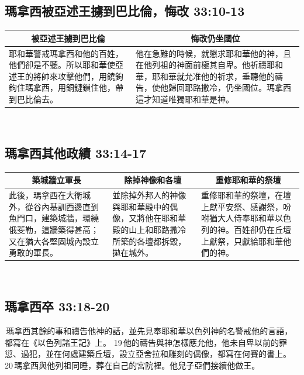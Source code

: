 \subsection{瑪拿西被亞述王擄到巴比倫，悔改 33:10-13}
\begin{table}[H]
\centering
\begin{tabular}{p{7.2cm}|p{}}\hline\hline
\multicolumn{1}{c|}{被亞述王擄到巴比倫}&\multicolumn{1}{c}{悔改仍坐國位}\\\hline
耶和華警戒瑪拿西和他的百姓，他們卻是不聽。所以耶和華使亞述王的將帥來攻擊他們，用鐃鉤鉤住瑪拿西，用銅鏈鎖住他，帶到巴比倫去。
&他在急難的時候，就懇求耶和華他的神，且在他列祖的神面前極其自卑。他祈禱耶和華，耶和華就允准他的祈求，垂聽他的禱告，使他歸回耶路撒冷，仍坐國位。瑪拿西這才知道唯獨耶和華是神。\\\hline 
\end{tabular}
\end{table} 



\subsection{瑪拿西其他政績 33:14-17}
\begin{table}[H]
\centering
\begin{tabular}{p{5.5cm}|p{}|p{5.5cm}}\hline\hline
\multicolumn{1}{c|}{築城牆立軍長}&\multicolumn{1}{c|}{除掉神像和各壇}&\multicolumn{1}{c}{重修耶和華的祭壇}\\\hline
此後，瑪拿西在大衛城外，從谷內基訓西邊直到魚門口，建築城牆，環繞俄斐勒，這牆築得甚高；又在猶大各堅固城內設立勇敢的軍長。
&並除掉外邦人的神像與耶和華殿中的偶像，又將他在耶和華殿的山上和耶路撒冷所築的各壇都拆毀，拋在城外。
&重修耶和華的祭壇，在壇上獻平安祭、感謝祭，吩咐猶大人侍奉耶和華以色列的神。百姓卻仍在丘壇上獻祭，只獻給耶和華他們的神。
\\\hline 
\end{tabular}
\end{table} 

\subsection{瑪拿西卒 33:18-20}
 瑪拿西其餘的事和禱告他神的話，並先見奉耶和華以色列神的名警戒他的言語，都寫在《以色列諸王記》上。 19 他的禱告與神怎樣應允他，他未自卑以前的罪愆、過犯，並在何處建築丘壇，設立亞舍拉和雕刻的偶像，都寫在何賽的書上。 20 瑪拿西與他列祖同睡，葬在自己的宮院裡。他兒子亞們接續他做王。


